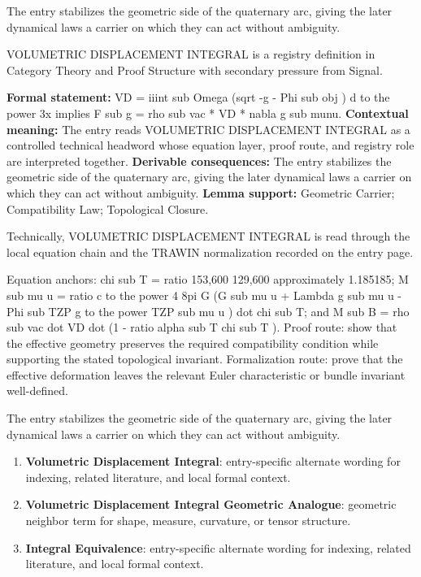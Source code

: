 The entry stabilizes the geometric side of the quaternary arc, giving the later dynamical laws a carrier on which they can act without ambiguity.
\clearpage


\begingroup\small
{}
VOLUMETRIC DISPLACEMENT INTEGRAL is a registry definition in Category Theory and Proof Structure with secondary pressure from Signal.

\begingroup\footnotesize\setlength{\emergencystretch}{3em}\sloppy
\textbf{Formal statement:} VD = iiint sub Omega (sqrt -g - Phi sub obj ) d to the power 3x implies F sub g = rho sub vac * VD * nabla g sub munu. \textbf{Contextual meaning:} The entry reads VOLUMETRIC DISPLACEMENT INTEGRAL as a controlled technical headword whose equation layer, proof route, and registry role are interpreted together. \textbf{Derivable consequences:} The entry stabilizes the geometric side of the quaternary arc, giving the later dynamical laws a carrier on which they can act without ambiguity. \textbf{Lemma support:} Geometric Carrier; Compatibility Law; Topological Closure.\par
\endgroup

Technically, VOLUMETRIC DISPLACEMENT INTEGRAL is read through the local equation chain and the TRAWIN normalization recorded on the entry page.

Equation anchors: chi sub T = ratio 153,600 129,600 approximately 1.185185; M sub mu u = ratio c to the power 4 8pi G (G sub mu u + Lambda g sub mu u - Phi sub TZP g to the power TZP sub mu u ) dot chi sub T; and M sub B = rho sub vac dot VD dot (1 - ratio alpha sub T chi sub T ). Proof route: show that the effective geometry preserves the required compatibility condition while supporting the stated topological invariant. Formalization route: prove that the effective deformation leaves the relevant Euler characteristic or bundle invariant well-defined.

The entry stabilizes the geometric side of the quaternary arc, giving the later dynamical laws a carrier on which they can act without ambiguity.
\endgroup

\begin{enumerate}[leftmargin=1.6em,itemsep=6pt,topsep=4pt]
\item \textbf{Volumetric Displacement Integral}: entry-specific alternate wording for indexing, related literature, and local formal context.
\item \textbf{Volumetric Displacement Integral Geometric Analogue}: geometric neighbor term for shape, measure, curvature, or tensor structure.
\item \textbf{Integral Equivalence}: entry-specific alternate wording for indexing, related literature, and local formal context.
\end{enumerate}

